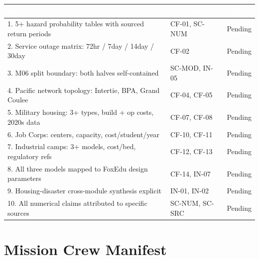 \documentclass[11pt,letterpaper]{article}
\newcommand{\tableheader}[1]{\textbf{\sffamily\textcolor{white}{#1}}}
\begin{document}
\begin{center}
\begin{tabularx}{\textwidth}{XL{3.5cm}C{1.5cm}}
\toprule
{}
\tableheader{Success Criterion} & \tableheader{Test ID(s)} & \tableheader{Status} \\
. 5+ hazard probability tables with sourced return periods & CF-01, SC-NUM & Pending \\
2. Service outage matrix: 72hr / 7day / 14day / 30day & CF-02 & Pending \\
3. M06 split boundary: both halves self-contained & SC-MOD, IN-05 & Pending \\
4. Pacific network topology: Intertie, BPA, Grand Coulee & CF-04, CF-05 & Pending \\
5. Military housing: 3+ types, build + op costs, 2020s data & CF-07, CF-08 & Pending \\
6. Job Corps: centers, capacity, cost/student/year & CF-10, CF-11 & Pending \\
7. Industrial camps: 3+ models, cost/bed, regulatory refs & CF-12, CF-13 & Pending \\
8. All three models mapped to FoxEdu design parameters & CF-14, IN-07 & Pending \\
9. Housing-disaster cross-module synthesis explicit & IN-01, IN-02 & Pending \\
10. All numerical claims attributed to specific sources & SC-NUM, SC-SRC & Pending \\
\bottomrule
\end{tabularx}
\end{center}

\section{Mission Crew Manifest}
\end{document}
